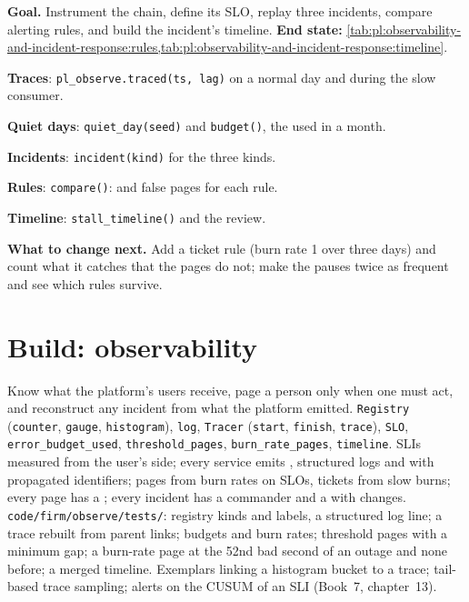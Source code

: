 \begin{tutorial}
\textbf{Goal.} Instrument the chain, define its SLO, replay three incidents, compare alerting rules, and build the incident's timeline.
\textbf{End state:} \cref{tab:pl:observability-and-incident-response:rules,tab:pl:observability-and-incident-response:timeline}.
\begin{tutsteps}
\item \textbf{Traces}: \texttt{pl\_observe.traced(ts, lag)} on a normal day and during the slow consumer.
\item \textbf{Quiet days}: \texttt{quiet\_day(seed)} and \texttt{budget()}, the  used in a month.
\item \textbf{Incidents}: \texttt{incident(kind)} for the three kinds.
\item \textbf{Rules}: \texttt{compare()}:  and false pages for each rule.
\item \textbf{Timeline}: \texttt{stall\_timeline()} and the review.
\end{tutsteps}
\textbf{What to change next.} Add a ticket rule (burn rate 1 over three days) and count what it catches that the pages do not; make the
pauses twice as frequent and see which rules survive.
\end{tutorial}

\section{Build: observability}\label{bld:pl:observability-and-incident-response:observe}

\begin{build}
 Know what the platform's users receive, page a person only when one must act, and reconstruct any incident from what the
platform emitted.
 \texttt{Registry} (\texttt{counter}, \texttt{gauge}, \texttt{histogram}), \texttt{log}, \texttt{Tracer} (\texttt{start},
\texttt{finish}, \texttt{trace}), \texttt{SLO}, \texttt{error\_budget\_used}, \texttt{threshold\_pages}, \texttt{burn\_rate\_pages},
\texttt{timeline}.
 SLIs measured from the user's side; every service emits , structured logs and  with propagated identifiers; pages
from burn rates on SLOs, tickets from slow burns; every page has a ; every incident has a commander and a  with
changes.
 \texttt{code/firm/observe/tests/}: registry kinds and labels, a structured log line; a trace rebuilt from parent
links; budgets and burn rates; threshold pages with a minimum gap; a burn-rate page at the 52nd bad second of an outage and none before; a
merged timeline.
 Exemplars linking a histogram bucket to a trace; tail-based trace sampling; alerts on the CUSUM of an SLI (Book~7,
chapter~13).
\end{build}

